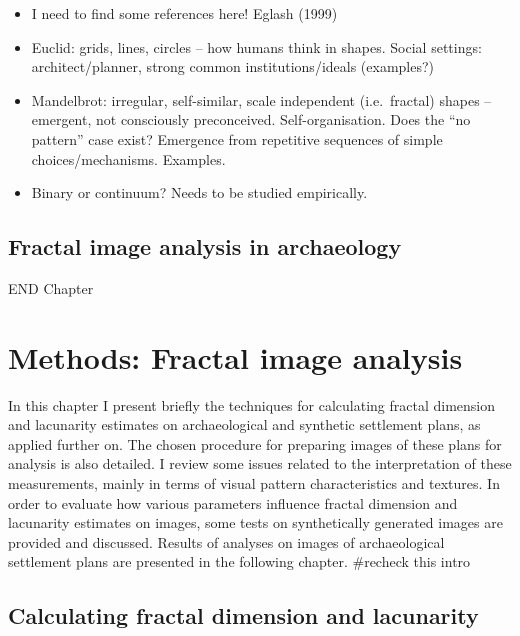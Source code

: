\documentclass[
  12pt,
  a4paper, twoside]{book}
\begin{document}
\begin{itemize}
\item
  I need to find some references here! Eglash (1999)
\item
  Euclid: grids, lines, circles -- how humans think in shapes. Social settings: architect/planner, strong common institutions/ideals (examples?)
\item
  Mandelbrot: irregular, self-similar, scale independent (i.e.~fractal) shapes -- emergent, not consciously preconceived. Self-organisation. Does the ``no pattern'' case exist? Emergence from repetitive sequences of simple choices/mechanisms. Examples.
\item
  Binary or continuum? Needs to be studied empirically.
\end{itemize}

\hypertarget{image-archaeo}{%
\section{Fractal image analysis in archaeology}\label{image-archaeo}}

END Chapter

\hypertarget{images-methods}{%
\chapter{Methods: Fractal image analysis}\label{images-methods}}

In this chapter I present briefly the techniques for calculating fractal dimension and lacunarity estimates on archaeological and synthetic settlement plans, as applied further on. The chosen procedure for preparing images of these plans for analysis is also detailed. I review some issues related to the interpretation of these measurements, mainly in terms of visual pattern characteristics and textures. In order to evaluate how various parameters influence fractal dimension and lacunarity estimates on images, some tests on synthetically generated images are provided and discussed. Results of analyses on images of archaeological settlement plans are presented in the following chapter. \#recheck this intro

\hypertarget{images-procedure}{%
\section{Calculating fractal dimension and lacunarity}\label{images-procedure}}
\end{document}
